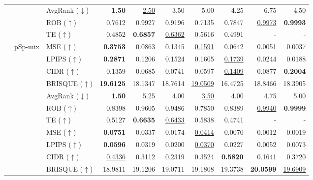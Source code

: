 \documentclass{article}
\begin{document}
\begin{table}[h!]
\begin{tabular}{lllrrrrrrr}
& & AvgRank ($\downarrow$) & \textbf{1.50} & \underline{2.50} & 3.50 & 5.00 & 4.25 & 6.75 & 4.50 \\

\cmidrule(lr){3-10}

& & ROB ($\uparrow$) & 0.7612 & 0.9927 & 0.9196 & 0.7135 & 0.7847 & \underline{0.9973} & \textbf{0.9993} \\
& & TE ($\uparrow$) & 0.4852 & \textbf{0.6857} & \underline{0.6362} & 0.5616 & 0.4991 & - & -\\
\cmidrule(lr){2-10}

& \multirow{9}{*}{pSp-mix}
& MSE ($\uparrow$) & \textbf{0.3753} & 0.0863 & 0.1345 & \underline{0.1591} & 0.0642 & 0.0051 & 0.0037 \\
& & LPIPS ($\uparrow$) & \textbf{0.2871} & 0.1206 & 0.1524 & 0.1605 & \underline{0.1739} & 0.0244 & 0.0188 \\
& & CIDR ($\uparrow$) & 0.1359 & 0.0685 & 0.0741 & 0.0597 & \underline{0.1409} & 0.0877 & \textbf{0.2004} \\
& & BRISQUE ($\uparrow$) & \textbf{19.6125} & 18.1347 & 18.7614 & \underline{19.0509} & 16.4725 & 18.8466 & 18.3905 \\
\cmidrule(lr){3-10}

& & AvgRank ($\downarrow$) & \textbf{1.50} & 5.25 & 4.00 & \underline{3.50} & 4.00 & 4.75 & 5.00 \\

\cmidrule(lr){3-10}

& & ROB ($\uparrow$) & 0.8398 & 0.9605 & 0.9486 & 0.7850 & 0.8389 & \underline{0.9940} & \textbf{0.9999} \\
& & TE ($\uparrow$) & 0.5127 & \textbf{0.6635} & \underline{0.6433} & 0.5838 & 0.4741 & - & -\\

\cmidrule(lr){2-10}

& \multirow{9}{*}{BlendFace}
& MSE ($\uparrow$) & \textbf{0.0751} & 0.0337 & 0.0174 & \underline{0.0414} & 0.0070 & 0.0012 & 0.0019 \\
& & LPIPS ($\uparrow$) & \textbf{0.0596} & 0.0319 & 0.0200 & \underline{0.0370} & 0.0227 & 0.0052 & 0.0073 \\
& & CIDR ($\uparrow$) & \underline{0.4336} & 0.3112 & 0.2319 & 0.3524 & \textbf{0.5820} & 0.1641 & 0.3720 \\
& & BRISQUE ($\uparrow$) & 18.9811 & 19.1206 & 19.0711 & 19.1808 & 19.3738 & \textbf{20.0599} & \underline{19.6909} \\
\cmidrule(lr){3-10}


\end{tabular}
\end{table}
\end{document}
